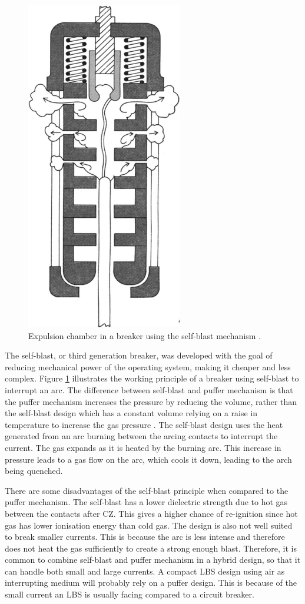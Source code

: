 \documentclass[10pt,a4paper,twoside]{article}
\begin{document}
\begin{figure} [H]
\centering
\includegraphics[scale=0.36]{Bilder/Theory/selfBlast.png}
\caption{Expulsion chamber in a breaker using the self-blast mechanism \cite{bib:CBAC}.} \label{fig:selfBlast}
\end{figure}

The self-blast, or third generation breaker, was developed with the goal of reducing mechanical power of the operating system, making it cheaper and less complex. Figure \ref{fig:selfBlast} illustrates the working principle of a breaker using self-blast to interrupt an arc. The difference between self-blast and puffer mechanism is that the puffer mechanism increases the pressure by reducing the volume, rather than the self-blast design which has a constant volume relying on a raise in temperature to increase the gas pressure \cite{bib:CBAC}. The self-blast design uses the heat generated from an arc burning between the arcing contacts to interrupt the current. The gas expands as it is heated by the burning arc. This increase in pressure leads to a gas flow on the arc, which cools it down, leading to the arch being quenched.

There are some disadvantages of the self-blast principle when compared to the puffer mechanism. The self-blast has a lower dielectric strength due to hot gas between the contacts after CZ. This gives a higher chance of re-ignition since hot gas has lower ionisation energy than cold gas. The design is also not well suited to break smaller currents. This is because the arc is less intense and therefore does not heat the gas sufficiently to create a strong enough blast. Therefore, it is common to combine self-blast and puffer mechanism in a hybrid design, so that it can handle both small and large currents. A compact LBS design using air as interrupting medium will probably rely on a puffer design. This is because of the small current an LBS is usually facing compared to a circuit breaker.
\end{document}
